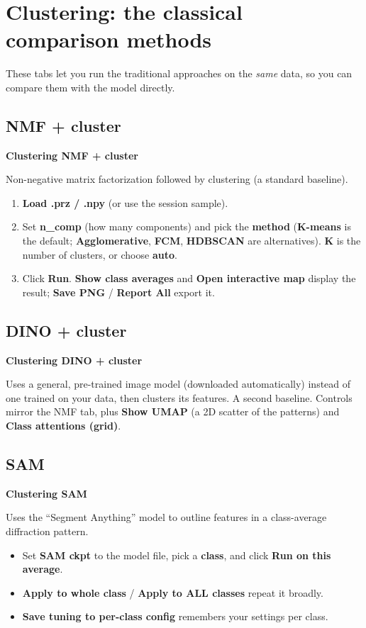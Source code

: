 \documentclass[11pt]{article}
\newcommand{\btn}[1]{\textbf{#1}}
\newcommand{\tab}[1]{\textsf{\textbf{#1}}}
\begin{document}
\section{Clustering: the classical comparison methods}
These tabs let you run the traditional approaches on the \emph{same} data, so you
can compare them with the model directly.

\subsection{NMF + cluster}
\tab{Clustering \textrightarrow{} NMF + cluster}

Non-negative matrix factorization followed by clustering (a standard baseline).
\begin{enumerate}[itemsep=2pt]
\item \btn{Load .prz / .npy} (or use the session sample).
\item Set \textbf{n\_comp} (how many components) and pick the \textbf{method}
(\textbf{K-means} is the default; \textbf{Agglomerative}, \textbf{FCM},
\textbf{HDBSCAN} are alternatives). \textbf{K} is the number of clusters, or choose
\textbf{auto}.
\item Click \btn{Run}. \btn{Show class averages} and \btn{Open interactive map}
display the result; \btn{Save PNG} / \btn{Report All} export it.
\end{enumerate}

\subsection{DINO + cluster}
\tab{Clustering \textrightarrow{} DINO + cluster}

Uses a general, pre-trained image model (downloaded automatically) instead of one
trained on your data, then clusters its features. A second baseline. Controls
mirror the NMF tab, plus \btn{Show UMAP} (a 2D scatter of the patterns) and
\btn{Class attentions (grid)}.

\subsection{SAM}
\tab{Clustering \textrightarrow{} SAM}

Uses the ``Segment Anything'' model to outline features in a class-average
diffraction pattern.
\begin{itemize}[itemsep=2pt]
\item Set \textbf{SAM ckpt} to the model file, pick a \textbf{class}, and click
\btn{Run on this average}.
\item \btn{Apply to whole class} / \btn{Apply to ALL classes} repeat it broadly.
\item \btn{Save tuning to per-class config} remembers your settings per class.
\end{itemize}
\end{document}

